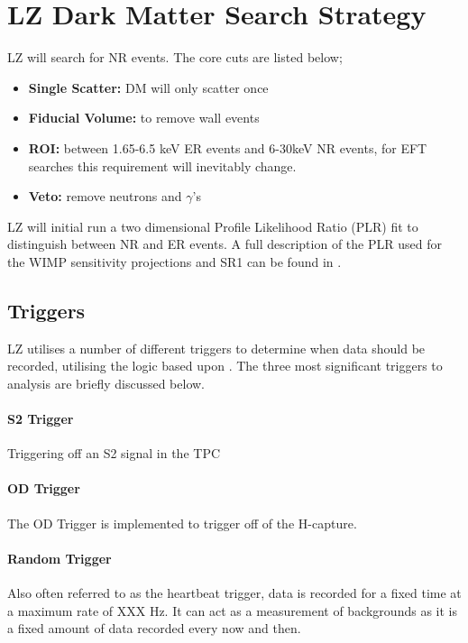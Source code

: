 \section{LZ Dark Matter Search Strategy}
\par
LZ will search for NR events.
The core cuts are listed below;
\begin{itemize}
    \item \textbf{Single Scatter:} DM will only scatter once
    \item \textbf{Fiducial Volume:} to remove wall events
    \item \textbf{ROI:} between 1.65-6.5 keV ER events and 6-30keV NR events, for EFT searches this requirement will inevitably change.
    \item \textbf{Veto:} remove neutrons and $\gamma$'s 
\end{itemize}

\par
LZ will initial run a two dimensional Profile Likelihood Ratio (PLR) fit to distinguish between NR and ER events.
A full description of the PLR used for the WIMP sensitivity projections and SR1 can be found in \cite{LZ_Ibles_LZStats_Thesis_ref}. 




\subsection{Triggers}
\par
LZ utilises a number of different triggers to determine when data should be recorded, utilising the logic based upon \cite{lux_trigger_logic_ref}.
The three most significant triggers to analysis are briefly discussed below.


\paragraph{S2 Trigger}
\par
Triggering off an S2 signal in the TPC

\paragraph{OD Trigger}
\par
The OD Trigger is implemented to trigger off of the H-capture.


\paragraph{Random Trigger}
Also often referred to as the heartbeat trigger, data is recorded for a fixed time at a maximum rate of XXX Hz.
It can act as a measurement of backgrounds as it is a fixed amount of data recorded every now and then.


